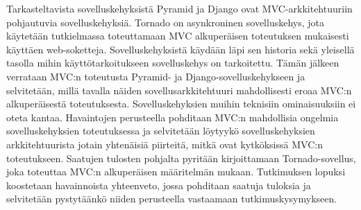 \documentclass[utf8]{gradu3}
\begin{document}
Tarkasteltavista sovelluskehyksistä Pyramid ja Django ovat MVC-arkkitehtuuriin pohjautuvia sovelluskehyksiä. Tornado on asynkroninen sovelluskehys, jota käytetään tutkielmassa toteuttamaan MVC alkuperäisen toteutuksen mukaisesti käyttäen web-soketteja. Sovelluskehyksistä käydään läpi sen 
historia sekä yleisellä tasolla mihin käyttötarkoitukseen
sovelluskehys on tarkoitettu. Tämän jälkeen verrataan MVC:n toteutusta 
Pyramid- ja Django-sovelluskehykseen ja selvitetään, millä tavalla näiden sovellusarkkitehtuuri mahdollisesti eroaa MVC:n alkuperäisestä toteutuksesta. Sovelluskehyksien muihin teknisiin ominaisuuksiin ei oteta kantaa.
Havaintojen perusteella pohditaan MVC:n mahdollisia ongelmia sovelluskehyksien toteutuksessa 
ja selvitetään löytyykö sovelluskehyksien arkkitehtuurista jotain yhtenäisiä piirteitä, mitkä ovat
kytköksissä MVC:n toteutukseen. Saatujen tulosten pohjalta pyritään kirjoittamaan Tornado-sovellus, joka toteuttaa MVC:n 
alkuperäisen määritelmän mukaan. Tutkimuksen lopuksi koostetaan havainnoista yhteenveto, jossa pohditaan saatuja tuloksia ja selvitetään 
pystytäänkö niiden perusteella vastaamaan tutkimuskysymykseen.
\end{document}
